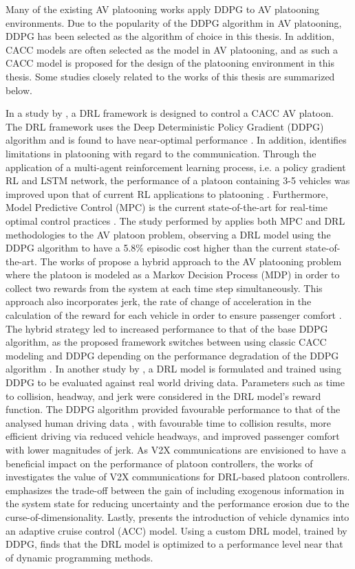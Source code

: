 Many of the existing AV platooning works apply DDPG to AV platooning environments.
Due to the popularity of the DDPG algorithm in AV platooning, DDPG has been selected
as the algorithm of choice in this thesis.
In addition, CACC models are often selected as the model in AV platooning, and as such
a CACC model is proposed for the design of the platooning environment in this thesis.
Some studies closely related to the works of this thesis are summarized below.

In a study
by \cite{Lin2019},  a DRL framework is designed to control a CACC AV platoon.  The
DRL framework uses the Deep Deterministic Policy Gradient (DDPG) \cite{Lillicrap2016}
algorithm and is found to have near-optimal performance \cite{Lin2019}.  In addition,
\cite{Peake2020} identifies limitations in platooning with regard to the communication.
Through the application of a multi-agent reinforcement learning process, i.e. a policy
gradient RL and LSTM network, the performance of a platoon containing 3-5 vehicles was
improved upon that of current RL applications to platooning \cite{Peake2020}. Furthermore,
Model Predictive Control (MPC) is the current state-of-the-art for real-time optimal
control practices \cite{Lin_2021}.  The study performed by \cite{Lin_2021} applies both
MPC and DRL methodologies to the AV platoon problem, observing a DRL model using the
DDPG algorithm to have a 5.8\% episodic cost higher than the current state-of-the-art.
The works of \cite{yan2021hybrid} propose a hybrid approach to the AV platooning
problem where the platoon is modeled as a Markov Decision Process (MDP) in order to
collect two rewards from the system at each time step simultaneously.  This approach
also incorporates jerk, the rate of change of acceleration in the calculation of the
reward for each vehicle in order to ensure passenger comfort \cite{yan2021hybrid}.  The
hybrid strategy led to increased performance to that of the base DDPG algorithm, as the
proposed framework switches between using classic CACC modeling and DDPG depending on
the performance degradation of the DDPG algorithm \cite{yan2021hybrid}. In another
study by \cite{Zhu2019}, a DRL model is formulated and trained using DDPG to be evaluated
against real world driving data. Parameters such as time to collision, headway, and jerk
were considered in the DRL model's reward function.  The DDPG algorithm provided favourable
performance to that of the analysed human driving data \cite{Zhu2019}, with favourable
time to collision results, more efficient driving via reduced vehicle headways, and
improved passenger comfort with lower magnitudes of jerk. As V2X
communications are envisioned to have a beneficial impact on the performance of platoon
controllers, the works of \cite{LeiV2x} investigates the value of V2X communications for
DRL-based platoon controllers. \cite{LeiV2x} emphasizes the trade-off between the gain of
including exogenous information in the system state for reducing uncertainty and the
performance erosion due to the curse-of-dimensionality. Lastly, \cite{Yuan2019}
presents the introduction of vehicle dynamics into an adaptive cruise control (ACC) model.
Using a custom DRL model, trained by DDPG, \cite{Yuan2019} finds that the DRL model is optimized
to a performance level near that of dynamic programming methods.

